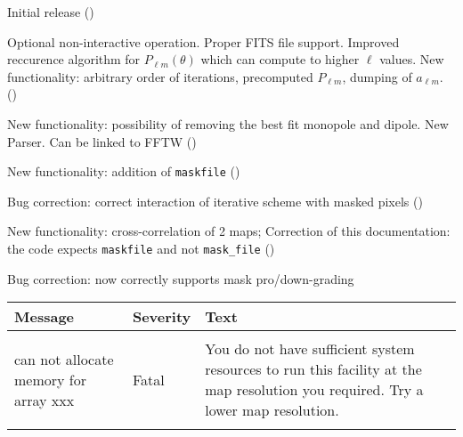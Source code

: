 \begin{release}
  \begin{relist}
    \item Initial release ()
    \item Optional non-interactive operation. Proper FITS file
    support. Improved reccurence algorithm for $P_{\ell m}(\theta)$ which can compute to higher $\ell$ values. New functionality: arbitrary order of iterations, precomputed
    $P_{\ell m}$, dumping of $a_{\ell m}$. ()
    \item New functionality: possibility of removing the best fit monopole
    and dipole. New Parser. Can be linked to FFTW ()
    \item New functionality: addition of {\tt{maskfile}} ()
    \item Bug correction: correct interaction of iterative scheme with masked pixels ()
    \item New functionality: cross-correlation of 2 maps; Correction of this documentation: the code expects {\tt maskfile} and
not {\tt mask\_file}  ()
    \item Bug correction: now correctly supports mask pro/down-grading
  \end{relist}
\end{release}

\begin{messages}
{
\begin{tabular}{p{0.25\hsize} p{0.1\hsize} p{0.35\hsize}} \hline  
  \textbf{Message} & \textbf{Severity} & \textbf{Text} \\ \hline
                   &                   &   \\ %
can not allocate memory for array xxx &  Fatal & You do not have
                   sufficient system resources to run this
                   facility at the map resolution you required. 
  Try a lower map resolution.  \\ 
                   &                   &   \\ \hline %
\end{tabular}
} 
\end{messages}
%
\newpage
%
